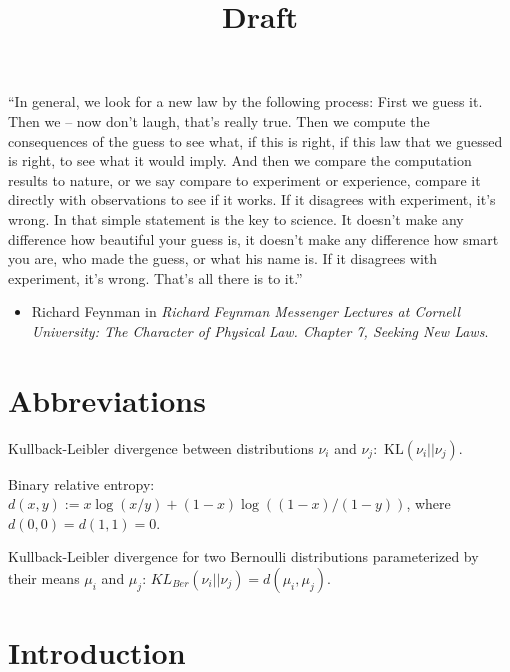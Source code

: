 \documentclass[12pt,]{article}
\title{Draft}
\author{}
\date{}
\providecommand{\tightlist}{%
  \setlength{\itemsep}{0pt}\setlength{\parskip}{0pt}}
\newcommand{\KL}{\,\text{KL}}
\begin{document}
\maketitle

{
\hypersetup{linkcolor=black}
\setcounter{tocdepth}{2}
\tableofcontents
}
\newpage

``In general, we look for a new law by the following process: First we
guess it. Then we -- now don't laugh, that's really true. Then we
compute the consequences of the guess to see what, if this is right, if
this law that we guessed is right, to see what it would imply. And then
we compare the computation results to nature, or we say compare to
experiment or experience, compare it directly with observations to see
if it works. If it disagrees with experiment, it's wrong. In that simple
statement is the key to science. It doesn't make any difference how
beautiful your guess is, it doesn't make any difference how smart you
are, who made the guess, or what his name is. If it disagrees with
experiment, it's wrong. That's all there is to it.''

\begin{itemize}
\tightlist
\item
  Richard Feynman in \emph{Richard Feynman Messenger Lectures at Cornell
  University: The Character of Physical Law. Chapter 7, Seeking New
  Laws}.
\end{itemize}

\newpage

\section{Abbreviations}\label{abbreviations}

Kullback-Leibler divergence between distributions \(\nu_i\) and
\(\nu_j\): \(\KL(\nu_i||\nu_j)\).

Binary relative entropy:
\(d(x,y) := x \log(x/y) + (1-x) \log((1-x)/(1-y))\), where
\(d(0,0) = d(1,1) = 0\).

Kullback-Leibler divergence for two Bernoulli distributions
parameterized by their means \(\mu_i\) and \(\mu_j\):
\(KL_{Ber}(\nu_i||\nu_j) = d(\mu_i, \mu_j)\).

\newpage

\section{\texorpdfstring{Introduction
\label{chap:Introduction}}{Introduction }}\label{introduction}
\end{document}
